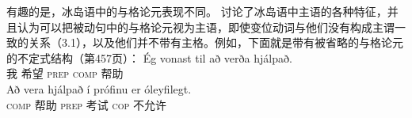 \noindent
有趣的是，冰岛语中的与格论元表现不同。 \citet{ZMT85a}讨论了冰岛语中主语的各种特征，并且认为可以把被动句中的与格论元视为主语，即使变位动词与他们没有构成主谓一致的关系（3.1），以及他们并不带有主格。例如，下面就是带有被省略的与格论元的不定式结构（第457页）：
\eal
\ex 
\gll Ég vonast til  að verða hjálpað.\\
     我 希望    \textsc{prep} \textsc{comp} \passive{} 帮助\\
\ex
\gll Að vera hjálpað í prófinu er óleyfilegt.\\
     \textsc{comp} \passive{} 帮助 \textsc{prep} 考试 \textsc{cop} 不允许\\
\zl

